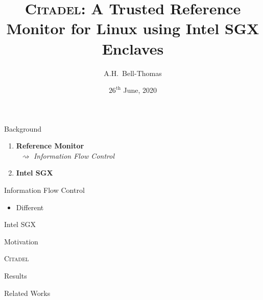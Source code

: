\documentclass[xcolor=dvipsnames]{beamer}
\title{\textsc{Citadel}: A Trusted Reference Monitor for Linux using Intel SGX Enclaves}
\author{A.H.~Bell-Thomas}
\institute{Computer Laboratory, University of Cambridge}
\date{\scriptsize $26^{\text{th}}$ June, 2020}
\begin{document}
\frame{\titlepage}

\begin{frame}{Background}
\pause
{\large
\begin{enumerate}
    \item \textbf{Reference Monitor} \\
    \pause
    $\;\;\rightsquigarrow$ \textit{Information Flow Control}
    \pause
    \vspace{1cm}
    \item \textbf{Intel SGX}
\end{enumerate}
}
\end{frame}

\begin{frame}{Information Flow Control}
    
\begin{itemize}
    \item Different
\end{itemize}
    
\end{frame}

\begin{frame}{Intel SGX}
    
\end{frame}


\begin{frame}{Motivation}
    
\end{frame}

\begin{frame}{\textsc{Citadel}}
    
\end{frame}

\begin{frame}{Results}
    
\end{frame}

\begin{frame}{Related Works}
    
\end{frame}
\end{document}

